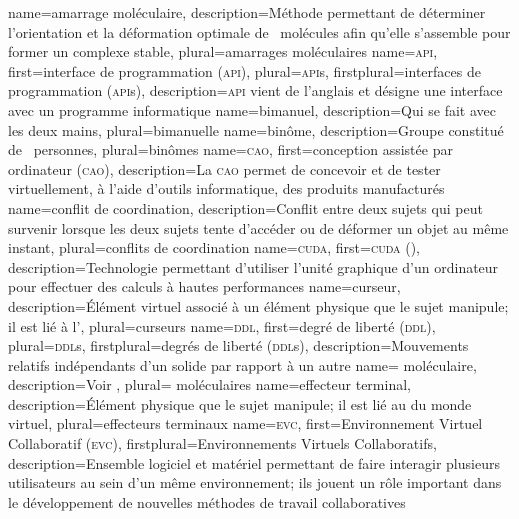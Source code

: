 %
{%
	name={amarrage moléculaire},%
	description={Méthode permettant de déterminer l'orientation et la déformation optimale de ~molécules afin qu'elle s'assemble pour former un complexe stable},%
	plural={amarrages moléculaires}%
}
%
{%
	name={\textsc{api}},%
	first={interface de programmation (\textsc{api})},%
	plural={\textsc{api}s},%
	firstplural={interfaces de programmation (\textsc{api}s)},%
	description={\textsc{api} vient de l'anglais  et désigne une interface avec un programme informatique}%
}
%
{%
	name={bimanuel},%
	description={Qui se fait avec les deux mains},%
	plural={bimanuelle}%
}
%
{%
	name={binôme},%
	description={Groupe constitué de ~personnes},%
	plural={binômes}%
}
%
{%
	name={\textsc{cao}},%
	first={conception assistée par ordinateur (\textsc{cao})},%
	description={La \textsc{cao} permet de concevoir et de tester virtuellement, à l'aide d'outils informatique, des produits manufacturés}%
}
%
{%
	name={conflit de coordination},%
	description={Conflit entre deux sujets qui peut survenir lorsque les deux sujets tente d'accéder ou de déformer un objet au même instant},%
	plural={conflits de coordination}%
}
%
{%
	name={\textsc{cuda}},%
	first={\textsc{cuda} ()},%
	description={Technologie permettant d'utiliser l'unité graphique d'un ordinateur pour effectuer des calculs à hautes performances}%
}
%
{%
	name={curseur},%
	description={Élément virtuel associé à un élément physique que le sujet manipule; il est lié à l'},%
	plural={curseurs}%
}
%
{%
	name={\textsc{ddl}},%
	first={degré de liberté (\textsc{ddl})},%
	plural={\textsc{ddl}s},%
	firstplural={degrés de liberté (\textsc{ddl}s)},%
	description={Mouvements relatifs indépendants d'un solide par rapport à un autre}%
}
%
{%
	name={ moléculaire},%
	description={Voir },%
	plural={ moléculaires}%
}
%
{%
	name={effecteur terminal},%
	description={Élément physique que le sujet manipule; il est lié au  du monde virtuel},%
	plural={effecteurs terminaux}%
}
%
{%
	name={\textsc{evc}},%
	first={Environnement Virtuel Collaboratif (\textsc{evc})},%
	firstplural={Environnements Virtuels Collaboratifs},%
	description={Ensemble logiciel et matériel permettant de faire interagir plusieurs utilisateurs au sein d'un même environnement; ils jouent un rôle important dans le développement de nouvelles méthodes de travail collaboratives}%
}
